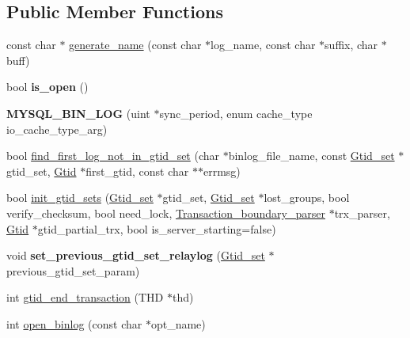 \subsection*{Public Member Functions}
\begin{DoxyCompactItemize}
\item 
const char $\ast$ \mbox{\hyperlink{group__Binary__Log_gabcd5b380680e537bdec0f093a8f2e3d6}{generate\+\_\+name}} (const char $\ast$log\+\_\+name, const char $\ast$suffix, char $\ast$buff)
\item 
\mbox{\label{classMYSQL__BIN__LOG_a813fe731e0079eb9f533c2167d8f46cc}} 
bool {\bfseries is\+\_\+open} ()
\item 
{\bfseries M\+Y\+S\+Q\+L\+\_\+\+B\+I\+N\+\_\+\+L\+OG} (uint $\ast$sync\+\_\+period, enum cache\+\_\+type io\+\_\+cache\+\_\+type\+\_\+arg)
\item 
bool \mbox{\hyperlink{group__Binary__Log_gab8925923df0bf9cd07f7fcaf45f8db16}{find\+\_\+first\+\_\+log\+\_\+not\+\_\+in\+\_\+gtid\+\_\+set}} (char $\ast$binlog\+\_\+file\+\_\+name, const \mbox{\hyperlink{classGtid__set}{Gtid\+\_\+set}} $\ast$gtid\+\_\+set, \mbox{\hyperlink{structGtid}{Gtid}} $\ast$first\+\_\+gtid, const char $\ast$$\ast$errmsg)
\item 
bool \mbox{\hyperlink{group__Binary__Log_gab52138e0e18c6bca2812e4051164db4f}{init\+\_\+gtid\+\_\+sets}} (\mbox{\hyperlink{classGtid__set}{Gtid\+\_\+set}} $\ast$gtid\+\_\+set, \mbox{\hyperlink{classGtid__set}{Gtid\+\_\+set}} $\ast$lost\+\_\+groups, bool verify\+\_\+checksum, bool need\+\_\+lock, \mbox{\hyperlink{classTransaction__boundary__parser}{Transaction\+\_\+boundary\+\_\+parser}} $\ast$trx\+\_\+parser, \mbox{\hyperlink{structGtid}{Gtid}} $\ast$gtid\+\_\+partial\+\_\+trx, bool is\+\_\+server\+\_\+starting=false)
\item 
\mbox{\label{classMYSQL__BIN__LOG_a0f1387595b8bd6b680a421a0803fe542}} 
void {\bfseries set\+\_\+previous\+\_\+gtid\+\_\+set\+\_\+relaylog} (\mbox{\hyperlink{classGtid__set}{Gtid\+\_\+set}} $\ast$previous\+\_\+gtid\+\_\+set\+\_\+param)
\item 
int \mbox{\hyperlink{group__Binary__Log_ga4e7e658ba27b48710cf57e3f8a8253e4}{gtid\+\_\+end\+\_\+transaction}} (T\+HD $\ast$thd)
\item 
int \mbox{\hyperlink{group__Binary__Log_ga44de4e3109fc4d50d4968191ab0f3544}{open\+\_\+binlog}} (const char $\ast$opt\+\_\+name)
\item 
$$
\end{DoxyCompactItemize}
